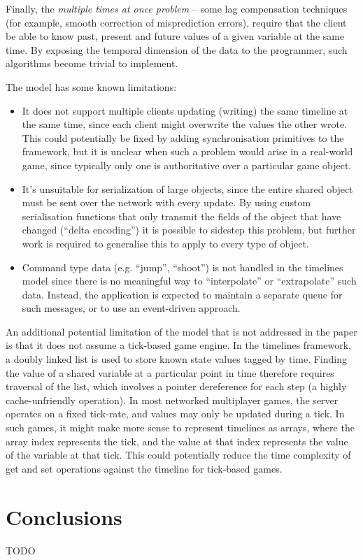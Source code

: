 \documentclass[conference]{IEEEtran}
\begin{document}
	Finally, the \emph{multiple times at once problem} -- some lag compensation techniques (for example, smooth correction of misprediction errors), require that the client be able to know past, present and future values of a given variable at the same time. By exposing the temporal dimension of the data to the programmer, such algorithms become trivial to implement.

	The model has some known limitations:

	\begin{itemize}
		\item It does not support multiple clients updating (writing) the same timeline at the same time, since each client might overwrite the values the other wrote. This could potentially be fixed by adding synchronisation primitives to the framework, but it is unclear when such a problem would arise in a real-world game, since typically only one is authoritative over a particular game object.
		\item It's unsuitable for serialization of large objects, since the entire shared object must be sent over the network with every update. By using custom serialisation functions that only transmit the fields of the object that have changed (``delta encoding'') it is possible to sidestep this problem, but further work is required to generalise this to apply to every type of object.
		\item Command type data (e.g. ``jump'', ``shoot'') is not handled in the timelines model since there is no meaningful way to ``interpolate'' or ``extrapolate'' such data. Instead, the application is expected to maintain a separate queue for such messages, or to use an event-driven approach.
	\end{itemize}

	An additional potential limitation of the model that is not addressed in the paper is that it does not assume a tick-based game engine. In the timelines framework, a doubly linked list is used to store known state values tagged by time. Finding the value of a shared variable at a particular point in time therefore requires traversal of the list, which involves a pointer dereference for each step (a highly cache-unfriendly operation). In most networked multiplayer games, the server operates on a fixed tick-rate, and values may only be updated during a tick. In such games, it might make more sense to represent timelines as arrays, where the array index represents the tick, and the value at that index represents the value of the variable at that tick. This could potentially reduce the time complexity of get and set operations against the timeline for tick-based games.

	\section{Conclusions}

	TODO

	\printbibliography
\end{document}
